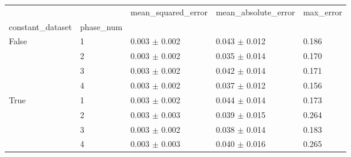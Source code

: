 \begin{tabular}{lllll}
\toprule
 &  & mean_squared_error & mean_absolute_error & max_error \\
constant_dataset & phase_num &  &  &  \\
\midrule
\multirow[t]{4}{*}{False} & 1 & 0.003 $\pm$ 0.002 & 0.043 $\pm$ 0.012 & 0.186 \\
 & 2 & 0.003 $\pm$ 0.002 & 0.035 $\pm$ 0.014 & 0.170 \\
 & 3 & 0.003 $\pm$ 0.002 & 0.042 $\pm$ 0.014 & 0.171 \\
 & 4 & 0.003 $\pm$ 0.002 & 0.037 $\pm$ 0.012 & 0.156 \\
\cline{1-5}
\multirow[t]{4}{*}{True} & 1 & 0.003 $\pm$ 0.002 & 0.044 $\pm$ 0.014 & 0.173 \\
 & 2 & 0.003 $\pm$ 0.003 & 0.039 $\pm$ 0.015 & 0.264 \\
 & 3 & 0.003 $\pm$ 0.002 & 0.038 $\pm$ 0.014 & 0.183 \\
 & 4 & 0.003 $\pm$ 0.003 & 0.040 $\pm$ 0.016 & 0.265 \\
\cline{1-5}
\bottomrule
\end{tabular}
